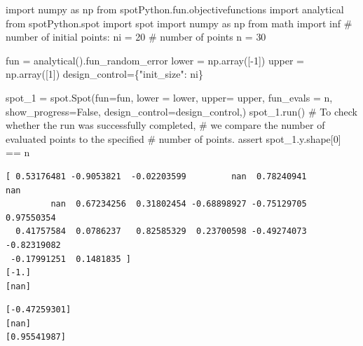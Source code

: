 \documentclass[
  letterpaper,
  DIV=11,
  numbers=noendperiod]{scrreprt}
\newenvironment{Shaded}{\begin{snugshade}}{\end{snugshade}}
\newcommand{\CommentTok}[1]{\textcolor[rgb]{0.37,0.37,0.37}{#1}}
\newcommand{\ControlFlowTok}[1]{\textcolor[rgb]{0.00,0.23,0.31}{#1}}
\newcommand{\DecValTok}[1]{\textcolor[rgb]{0.68,0.00,0.00}{#1}}
\newcommand{\ImportTok}[1]{\textcolor[rgb]{0.00,0.46,0.62}{#1}}
\newcommand{\NormalTok}[1]{\textcolor[rgb]{0.00,0.23,0.31}{#1}}
\newcommand{\OperatorTok}[1]{\textcolor[rgb]{0.37,0.37,0.37}{#1}}
\newcommand{\StringTok}[1]{\textcolor[rgb]{0.13,0.47,0.30}{#1}}
\newcommand{\VariableTok}[1]{\textcolor[rgb]{0.07,0.07,0.07}{#1}}
\begin{document}
\begin{Shaded}
\begin{Highlighting}[]
\ImportTok{import}\NormalTok{ numpy }\ImportTok{as}\NormalTok{ np}
\ImportTok{from}\NormalTok{ spotPython.fun.objectivefunctions }\ImportTok{import}\NormalTok{ analytical}
\ImportTok{from}\NormalTok{ spotPython.spot }\ImportTok{import}\NormalTok{ spot}
\ImportTok{import}\NormalTok{ numpy }\ImportTok{as}\NormalTok{ np}
\ImportTok{from}\NormalTok{ math }\ImportTok{import}\NormalTok{ inf}
\CommentTok{\# number of initial points:}
\NormalTok{ni }\OperatorTok{=} \DecValTok{20}
\CommentTok{\# number of points}
\NormalTok{n }\OperatorTok{=} \DecValTok{30}

\NormalTok{fun }\OperatorTok{=}\NormalTok{ analytical().fun\_random\_error}
\NormalTok{lower }\OperatorTok{=}\NormalTok{ np.array([}\OperatorTok{{-}}\DecValTok{1}\NormalTok{])}
\NormalTok{upper }\OperatorTok{=}\NormalTok{ np.array([}\DecValTok{1}\NormalTok{])}
\NormalTok{design\_control}\OperatorTok{=}\NormalTok{\{}\StringTok{"init\_size"}\NormalTok{: ni\}}

\NormalTok{spot\_1 }\OperatorTok{=}\NormalTok{ spot.Spot(fun}\OperatorTok{=}\NormalTok{fun,}
\NormalTok{            lower }\OperatorTok{=}\NormalTok{ lower,}
\NormalTok{            upper}\OperatorTok{=}\NormalTok{ upper,}
\NormalTok{            fun\_evals }\OperatorTok{=}\NormalTok{ n,}
\NormalTok{            show\_progress}\OperatorTok{=}\VariableTok{False}\NormalTok{,}
\NormalTok{            design\_control}\OperatorTok{=}\NormalTok{design\_control,)}
\NormalTok{spot\_1.run()}
\CommentTok{\# To check whether the run was successfully completed,}
\CommentTok{\# we compare the number of evaluated points to the specified}
\CommentTok{\# number of points.}
\ControlFlowTok{assert}\NormalTok{ spot\_1.y.shape[}\DecValTok{0}\NormalTok{] }\OperatorTok{==}\NormalTok{ n}
\end{Highlighting}
\end{Shaded}

\begin{verbatim}
[ 0.53176481 -0.9053821  -0.02203599         nan  0.78240941         nan
         nan  0.67234256  0.31802454 -0.68898927 -0.75129705  0.97550354
  0.41757584  0.0786237   0.82585329  0.23700598 -0.49274073 -0.82319082
 -0.17991251  0.1481835 ]
[-1.]
[nan]
\end{verbatim}

\begin{verbatim}
[-0.47259301]
[nan]
[0.95541987]
\end{verbatim}
\end{document}
